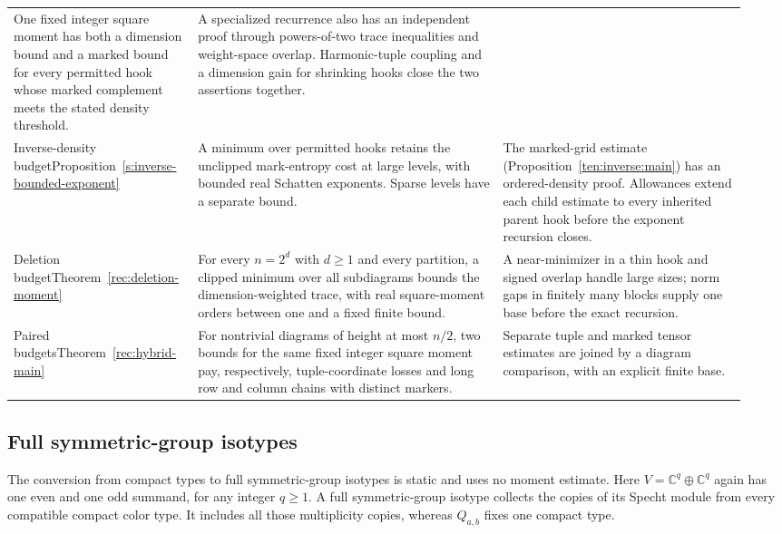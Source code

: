 \begin{longtable}{@{}>{\raggedright\arraybackslash}p{0.22\linewidth}>{\raggedright\arraybackslash}p{0.40\linewidth}>{\raggedright\arraybackslash}p{0.32\linewidth}@{}}
One fixed integer square moment has both a dimension bound and a marked bound for every permitted hook whose marked complement meets the stated density threshold. &
A specialized recurrence also has an independent proof through powers-of-two trace inequalities and weight-space overlap. Harmonic-tuple coupling and a dimension gain for shrinking hooks close the two assertions together.\\
\addlinespace[3pt]
Inverse-density budget\newline Proposition~\ref{s:inverse-bounded-exponent} &
A minimum over permitted hooks retains the unclipped mark-entropy cost at large levels, with bounded real Schatten exponents. Sparse levels have a separate bound. &
The marked-grid estimate (Proposition~\ref{ten:inverse:main}) has an ordered-density proof. Allowances extend each child estimate to every inherited parent hook before the exponent recursion closes.\\
\addlinespace[3pt]
Deletion budget\newline Theorem~\ref{rec:deletion-moment} &
For every \(n=2^d\) with \(d\ge1\) and every partition, a clipped minimum over all subdiagrams bounds the dimension-weighted trace, with real square-moment orders between one and a fixed finite bound. &
A near-minimizer in a thin hook and signed overlap handle large sizes; norm gaps in finitely many blocks supply one base before the exact recursion.\\
\addlinespace[3pt]
Paired budgets\newline Theorem~\ref{rec:hybrid-main} &
For nontrivial diagrams of height at most \(n/2\), two bounds for the same fixed integer square moment pay, respectively, tuple-coordinate losses and long row and column chains with distinct markers. &
Separate tuple and marked tensor estimates are joined by a diagram comparison, with an explicit finite base.\\
\end{longtable}
\endgroup

\subsection{Full symmetric-group isotypes}
The conversion from compact types to full symmetric-group isotypes is
static and uses no moment estimate. Here
$V=\mathbb C^q\oplus\mathbb C^q$ again has one even and one odd
summand, for any integer $q\ge1$. A full symmetric-group isotype
collects the copies of its Specht module from every compatible compact
color type. It includes all those multiplicity copies, whereas
$Q_{a,b}$ fixes one compact type.

